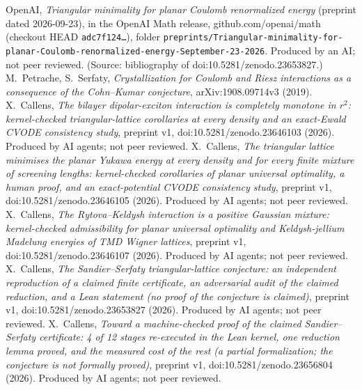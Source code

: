  OpenAI, \emph{Triangular minimality for planar Coulomb renormalized energy} (preprint dated
2026-09-23), in the OpenAI Math release, github.com/openai/math (checkout HEAD \texttt{adc7f124\ldots}), folder
\texttt{preprints/Triangular-minimality-for-planar-Coulomb-}\allowbreak\texttt{renormalized-energy-September-23-2026}. Produced by an AI;
not peer reviewed. (Source: bibliography of doi\string:10.5281/zenodo.23653827.)
 M.~Petrache, S.~Serfaty, \emph{Crystallization for Coulomb and Riesz interactions as a consequence of the
Cohn--Kumar conjecture}, arXiv:1908.09714v3 (2019).
 X.~Callens, \emph{The bilayer dipolar-exciton interaction is completely monotone in $r^2$:
kernel-checked triangular-lattice corollaries at every density and an exact-Ewald CVODE consistency study}, preprint v1,
doi\string:10.5281/zenodo.23646103 (2026). Produced by AI agents; not peer reviewed.
 X.~Callens, \emph{The triangular lattice minimises the planar Yukawa energy at every density and for every finite mixture of screening lengths: kernel-checked corollaries of planar universal optimality, a human proof, and an exact-potential CVODE consistency study}, preprint v1,
doi\string:10.5281/zenodo.23646105 (2026). Produced by AI agents; not peer reviewed.
 X.~Callens, \emph{The Rytova--Keldysh interaction is a positive Gaussian mixture: kernel-checked
admissibility for planar universal optimality and Keldysh-jellium Madelung energies of TMD Wigner lattices}, preprint v1,
doi\string:10.5281/zenodo.23646107 (2026). Produced by AI agents; not peer reviewed.
 X.~Callens, \emph{The Sandier--Serfaty triangular-lattice conjecture: an independent reproduction of a
claimed finite certificate, an adversarial audit of the claimed reduction, and a Lean statement (no proof of the
conjecture is claimed)}, preprint v1, doi\string:10.5281/zenodo.23653827 (2026). Produced by AI agents; not peer
reviewed.
 X.~Callens, \emph{Toward a machine-checked proof of the claimed Sandier--Serfaty certificate: 4 of 12
stages re-executed in the Lean kernel, one reduction lemma proved, and the measured cost of the rest (a partial
formalization; the conjecture is not formally proved)}, preprint v1, doi\string:10.5281/zenodo.23656804 (2026). Produced by
AI agents; not peer reviewed.
